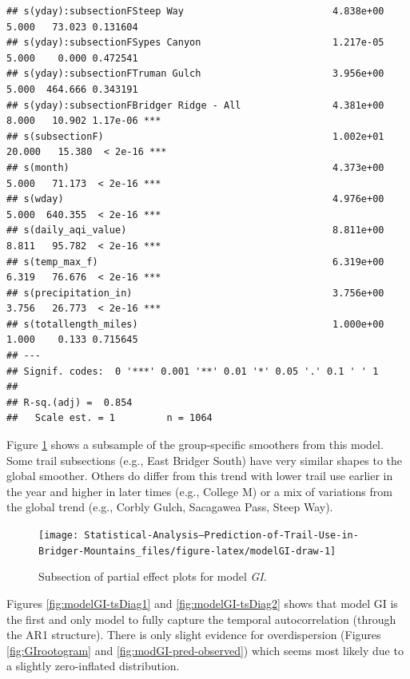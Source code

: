 \documentclass[
]{book}
\begin{document}
\begin{verbatim}
## s(yday):subsectionFSteep Way                          4.838e+00  5.000   73.023 0.131604    
## s(yday):subsectionFSypes Canyon                       1.217e-05  5.000    0.000 0.472541    
## s(yday):subsectionFTruman Gulch                       3.956e+00  5.000  464.666 0.343191    
## s(yday):subsectionFBridger Ridge - All                4.381e+00  8.000   10.902 1.17e-06 ***
## s(subsectionF)                                        1.002e+01 20.000   15.380  < 2e-16 ***
## s(month)                                              4.373e+00  5.000   71.173  < 2e-16 ***
## s(wday)                                               4.976e+00  5.000  640.355  < 2e-16 ***
## s(daily_aqi_value)                                    8.811e+00  8.811   95.782  < 2e-16 ***
## s(temp_max_f)                                         6.319e+00  6.319   76.676  < 2e-16 ***
## s(precipitation_in)                                   3.756e+00  3.756   26.773  < 2e-16 ***
## s(totallength_miles)                                  1.000e+00  1.000    0.133 0.715645    
## ---
## Signif. codes:  0 '***' 0.001 '**' 0.01 '*' 0.05 '.' 0.1 ' ' 1
## 
## R-sq.(adj) =  0.854   
##   Scale est. = 1         n = 1064
\end{verbatim}

Figure \ref{fig:modelGI-draw} shows a subsample of the group-specific smoothers from this model. Some trail subsections (e.g., East Bridger South) have very similar shapes to the global smoother. Others do differ from this trend with lower trail use earlier in the year and higher in later times (e.g., College M) or a mix of variations from the global trend (e.g., Corbly Gulch, Sacagawea Pass, Steep Way).

\begin{figure}

{\centering \texttt{[image: Statistical-Analysis--Prediction-of-Trail-Use-in-Bridger-Mountains\_files/figure-latex/modelGI-draw-1]} 

}

\caption{Subsection of partial effect plots for model \emph{GI}.}\label{fig:modelGI-draw}
\end{figure}

Figures \ref{fig:modelGI-tsDiag1} and \ref{fig:modelGI-tsDiag2} shows that model GI is the first and only model to fully capture the temporal autocorrelation (through the AR1 structure). There is only slight evidence for overdispersion (Figures \ref{fig:GIrootogram} and \ref{fig:modGI-pred-observed}) which seems most likely due to a slightly zero-inflated distribution.
\end{document}
